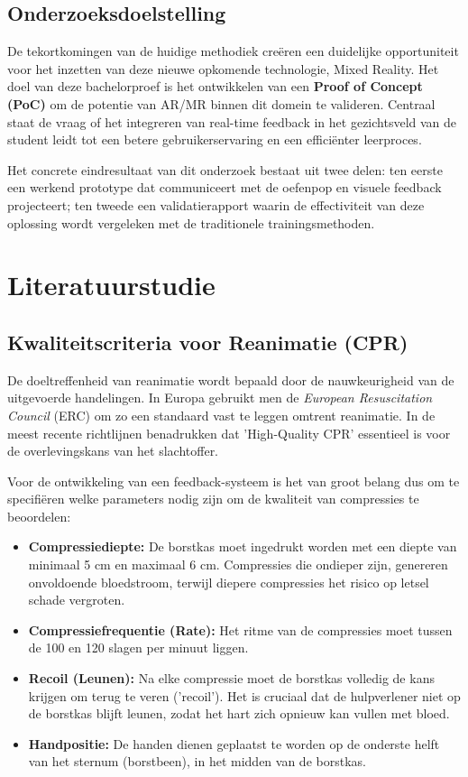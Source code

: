\subsection{Onderzoeksdoelstelling}
De tekortkomingen van de huidige methodiek creëren een duidelijke opportuniteit voor het inzetten van deze nieuwe opkomende technologie, Mixed Reality. 
Het doel van deze bachelorproef is het ontwikkelen van een \textbf{Proof of Concept (PoC)} om de potentie van AR/MR binnen dit domein te valideren. 
Centraal staat de vraag of het integreren van real-time feedback in het gezichtsveld van de student leidt tot een betere gebruikerservaring en een efficiënter leerproces.

Het concrete eindresultaat van dit onderzoek bestaat uit twee delen: ten eerste een werkend prototype dat communiceert met de oefenpop en visuele feedback projecteert; 
ten tweede een validatierapport waarin de effectiviteit van deze oplossing wordt vergeleken met de traditionele trainingsmethoden.


\section{Literatuurstudie}
\label{sec:literatuurstudie}


\subsection{Kwaliteitscriteria voor Reanimatie (CPR)}
De doeltreffenheid van reanimatie wordt bepaald door de nauwkeurigheid van de uitgevoerde handelingen. 
In Europa gebruikt men de \textit{European Resuscitation Council} (ERC) om zo een standaard vast te leggen omtrent reanimatie.
In de meest recente richtlijnen benadrukken \textcite{Olasveengen2021} dat 'High-Quality CPR' essentieel is voor de overlevingskans van het slachtoffer.


Voor de ontwikkeling van een feedback-systeem is het van groot belang dus om te specifiëren welke parameters nodig zijn om de kwaliteit van compressies te beoordelen:
\begin{itemize}
    \item \textbf{Compressiediepte:} De borstkas moet ingedrukt worden met een diepte van minimaal 5 cm en maximaal 6 cm. Compressies die ondieper zijn, 
    genereren onvoldoende bloedstroom, terwijl diepere compressies het risico op letsel schade vergroten.
    \item \textbf{Compressiefrequentie (Rate):} Het ritme van de compressies moet tussen de 100 en 120 slagen per minuut liggen.
\item \textbf{Recoil (Leunen):} Na elke compressie moet de borstkas volledig de kans krijgen om terug te veren ('recoil'). 
Het is cruciaal dat de hulpverlener niet op de borstkas blijft leunen, zodat het hart zich opnieuw kan vullen met bloed.
    \item \textbf{Handpositie:} De handen dienen geplaatst te worden op de onderste helft van het sternum (borstbeen), in het midden van de borstkas.
\end{itemize}

